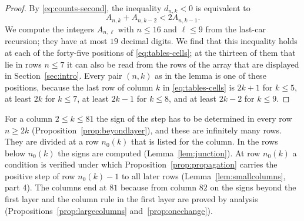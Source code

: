 \documentclass{amsart}
\makeatletter
\theoremstyle{definition}
\theoremstyle{remark}
\numberwithin{equation}{section}
\def\subsection{\@startsection{subsection}{2}\z@{.5\linespacing\@plus.7\linespacing}{-.5em}{\normalfont\bfseries\boldmath}}
\makeatother
\begin{document}
\begin{proof}
By \eqref{eq:counts-second}, the inequality $d_{n,k}<0$ is
equivalent to
\[
A_{n,k}+A_{n,k-2}<2A_{n,k-1}.
\]
We compute the integers $A_{n,\ell}$ with $n\le16$ and $\ell\le9$ from the
last-car recursion; they have at most $19$ decimal digits. We find that
this inequality holds at each of the forty-five positions of
\eqref{eq:tables-cells}; at the thirteen of them that lie in rows $n\le7$
it can also be read from the rows of the array that are displayed in
Section~\ref{sec:intro}. Every pair $(n,k)$ as in
the lemma is one of these positions, because the last row of column $k$ in
\eqref{eq:tables-cells} is $2k+1$ for $k\le5$, at least $2k$ for $k\le7$, at
least $2k-1$ for $k\le8$, and at least $2k-2$ for $k\le9$.
\end{proof}

\subsection{Columns 2 to 81}\label{subsec:tables-small}

For a column $2\le k\le81$ the sign of the step has to be determined in every
row $n\ge2k$ (Proposition~\ref{prop:beyondlayer}), and these are infinitely
many rows. They are divided at a row $n_0(k)$ that is listed for the column.
In the rows below $n_0(k)$ the signs are computed
(Lemma~\ref{lem:junction}). At row $n_0(k)$ a condition is verified
under which Proposition~\ref{prop:propagation} carries the positive step of
row $n_0(k)-1$ to all later rows (Lemma~\ref{lem:smallcolumns}, part 4).
The columns end at $81$ because
from column $82$ on the signs beyond the first layer and the column rule
in the first layer are proved by analysis
(Propositions~\ref{prop:largecolumns} and~\ref{prop:onechange}).
\end{document}
